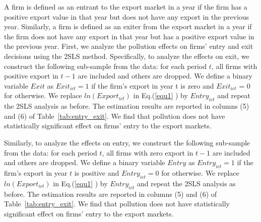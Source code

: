 \documentclass[12pt]{article}
\begin{document}
A firm is defined as an entrant to the export market in a year if the firm
has a positive export value in that year but does not have any export in the
previous year. Similarly, a firm is defined as an exiter from the export
market in a year if the firm does not have any export in that year but has a
positive export value in the previous year. First, we
analyze the pollution effects on firms’ entry and exit decisions using the 2SLS method.
Specifically, to analyze the effects on exit, we construct the following sub-sample from the data: for each period $t$, all firms with positive export in $t - 1$ are included and others are dropped. We define a binary
variable $Exit$ as $Exit_{ict} = 1 $ if the firm’s export in year t is
zero and $Exit_{ict}$ = 0 for otherwise.  We replace $ln(Export_{ict})$ in Eq.(\ref{equ1}%
) by $Entry_{ict}$ and repeat the 2SLS analysis as before. The estimation
results are reported in columns (5) and (6) of Table~\ref{tab:entry_exit}. We find that
pollution does not have statistically significant effect on firms' entry to
the export markets.

Similarly, to analyze the effects on entry, we construct the following
sub-sample from the data: for each period $t$, all firms with zero export in 
$t-1$ are included and others are dropped. We define a binary variable $%
Entry $ as $Entry_{ict}=1$ if the firm's export in year $t$ is positive and $%
Entry_{ict}=0$ for otherwise. We replace $ln(Export_{ict})$ in Eq.(\ref{equ1}%
) by $Entry_{ict}$ and repeat the 2SLS analysis as before. The estimation
results are reported in columns (5) and (6) of Table~\ref{tab:entry_exit}. We find that
pollution does not have statistically significant effect on firms' entry to
the export markets.
\end{document}
